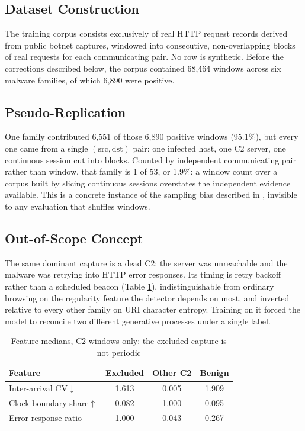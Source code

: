 \documentclass[conference,a4paper]{IEEEtran}
\begin{document}
\subsection{Dataset Construction}\label{sec:datasetconstruction}
The training corpus consists exclusively of real HTTP request records derived from public botnet captures, windowed into consecutive, non-overlapping blocks of real requests for each communicating pair. No row is synthetic. Before the corrections described below, the corpus contained 68{,}464 windows across six malware families, of which 6{,}890 were positive.

\subsection{Pseudo-Replication}\label{sec:pseudorep}
One family contributed 6{,}551 of those 6{,}890 positive windows (95.1\%), but every one came from a single \((\mathrm{src}, \mathrm{dst})\) pair: one infected host, one C2 server, one continuous session cut into blocks. Counted by independent communicating pair rather than window, that family is 1 of 53, or 1.9\%: a window count over a corpus built by slicing continuous sessions overstates the independent evidence available. This is a concrete instance of the sampling bias described in \cite{arp2022dos, pendlebury2019tesseract}, invisible to any evaluation that shuffles windows.

\subsection{Out-of-Scope Concept}\label{sec:outofscope}
The same dominant capture is a dead C2: the server was unreachable and the malware was retrying into HTTP error responses. Its timing is retry backoff rather than a scheduled beacon (Table \ref{tab:scope}), indistinguishable from ordinary browsing on the regularity feature the detector depends on most, and inverted relative to every other family on URI character entropy. Training on it forced the model to reconcile two different generative processes under a single label.

\begin{table}[t]
\caption{Feature medians, C2 windows only: the excluded capture is not periodic}
\label{tab:scope}
\centering
\small
\begin{tabular}{lccc}
\toprule
\textbf{Feature} & \textbf{Excluded} & \textbf{Other C2} & \textbf{Benign} \\
\midrule
Inter-arrival CV$\downarrow$ & 1.613 & 0.005 & 1.909 \\
Clock-boundary share$\uparrow$ & 0.082 & 1.000 & 0.095 \\
Error-response ratio & 1.000 & 0.043 & 0.267 \\
\bottomrule
\end{tabular}
\end{table}
\end{document}
